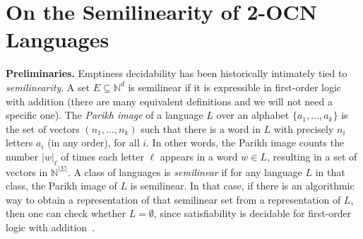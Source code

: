 \documentclass[11pt,a4paper]{amsart}
\theoremstyle{definition}
\newcommand{\mysubparagraph}[1]{\noindent \textbf{\textsf{#1}} }
\begin{document}
\section{On the Semilinearity of 2-OCN Languages}
\label{sec:semilinear}
\mysubparagraph{Preliminaries.}  Emptiness decidability has been historically
intimately tied to \emph{semilinearity}.  A set \(E \subseteq \mathbb{N}^d\) is semilinear if it is
expressible in first-order logic with addition (there are many equivalent
definitions and we will not need a specific one).  The \emph{Parikh image} of a
language \(L\) over an alphabet \(\{a_1, \ldots, a_k\}\) is the set of vectors
\((n_1, \ldots, n_k)\) such that there is a word in \(L\) with precisely \(n_i\) letters
\(a_i\) (in any order), for all \(i\).  In other words, the Parikh image counts the
number \(|w|_\ell\) of times each letter \(\ell\) appears in a word \(w \in L\), resulting in
a set of vectors in \(\mathbb{N}^{|\Sigma|}\).  A class of languages is \emph{semilinear} if for
any language \(L\) in that class, the Parikh image of \(L\) is semilinear.  In that
case, if there is an algorithmic way to obtain a representation of that
semilinear set from a representation of \(L\), then one can check whether
\(L = \emptyset\), since satisfiability is decidable for first-order logic with
addition~\cite{berman1980complexity}.
\end{document}

